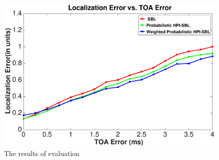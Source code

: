 \begin{figure}[hptb]
\begin{center}
{\begin{minipage}[t]{0.46\linewidth}
\includegraphics[width=1.150\textwidth]{image/TOA.eps}
\end{minipage}
}
\hspace{-0.1in}

\caption{\label{Fig3:}The results of evaluation}
\end{center}
 \vspace{-4mm}
\end{figure}
 \vspace{-1mm}
\fi






